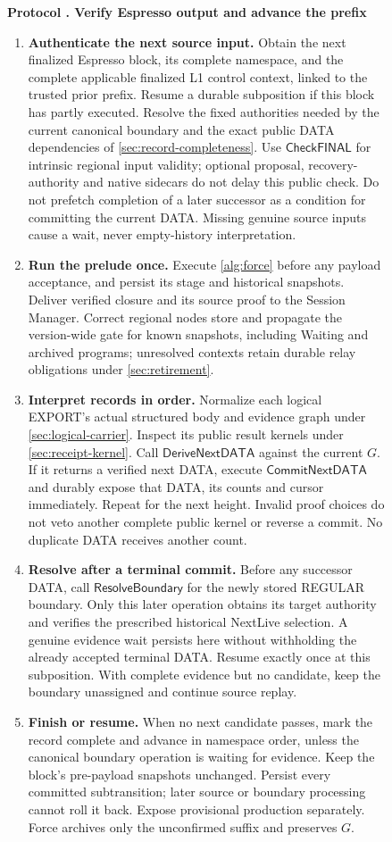 \documentclass[11pt,a4paper]{article}
\newcommand{\tagg}[1]{\ensuremath{\mathsf{#1}}}
\newcounter{protocol}
\newenvironment{protocol}[3][htbp]{\begin{figure}[#1]\refstepcounter{protocol}\label{#2}
\begin{mdframed}[linewidth=.6pt,skipabove=0pt,skipbelow=0pt,
innertopmargin=7pt,innerbottommargin=7pt]\small
\textbf{Protocol \theprotocol. #3}\par\smallskip}{\end{mdframed}\end{figure}}
\begin{document}
\begin{protocol}{alg:external}{Verify Espresso output and advance the prefix}
\begin{enumerate}[label=\textbf{\arabic*)},itemsep=3pt]
\item \textbf{Authenticate the next source input.} Obtain the next
finalized Espresso block, its complete namespace, and the complete
applicable finalized L1 control context, linked to the trusted prior
prefix. Resume a durable subposition if this block has partly executed.
Resolve the fixed authorities needed by the current canonical boundary
and the exact public DATA dependencies of \cref{sec:record-completeness}.
Use \tagg{CheckFINAL} for intrinsic regional input validity; optional
proposal, recovery-authority and native sidecars do not delay this
public check. Do not prefetch completion of a later successor as a
condition for committing the current DATA. Missing genuine source
inputs cause a wait, never empty-history interpretation.

\item \textbf{Run the prelude once.} Execute \cref{alg:force} before
any payload acceptance, and persist its stage and historical snapshots.
Deliver verified closure and its source proof to the Session Manager.
Correct regional nodes store and propagate the version-wide gate for
known snapshots, including Waiting and archived programs; unresolved
contexts retain durable relay obligations under \cref{sec:retirement}.

\item \textbf{Interpret records in order.} Normalize each logical EXPORT's
actual structured body and evidence graph under \cref{sec:logical-carrier}.
Inspect its public result kernels under \cref{sec:receipt-kernel}. Call
$\tagg{DeriveNextDATA}$ against the current $G$. If it returns a verified
next DATA, execute $\tagg{CommitNextDATA}$ and durably expose that DATA,
its counts and cursor immediately. Repeat for the next height. Invalid
proof choices do not veto another complete public kernel or reverse a commit.
No duplicate DATA receives another count.

\item \textbf{Resolve after a terminal commit.} Before any successor
DATA, call $\tagg{ResolveBoundary}$ for the newly stored REGULAR
boundary. Only this later operation obtains its target authority and
verifies the prescribed historical NextLive selection. A genuine
evidence wait persists here without withholding the already accepted
terminal DATA. Resume exactly once at this subposition. With complete
evidence but no candidate, keep the boundary unassigned and continue
source replay.

\item \textbf{Finish or resume.} When no next candidate passes, mark
the record complete and advance in namespace order, unless the canonical
boundary operation is waiting for evidence. Keep the block's pre-payload
snapshots unchanged. Persist every committed subtransition; later source
or boundary processing cannot roll it back. Expose provisional production
separately. Force archives only the unconfirmed suffix and preserves $G$.
\end{enumerate}
\end{protocol}
\end{document}
